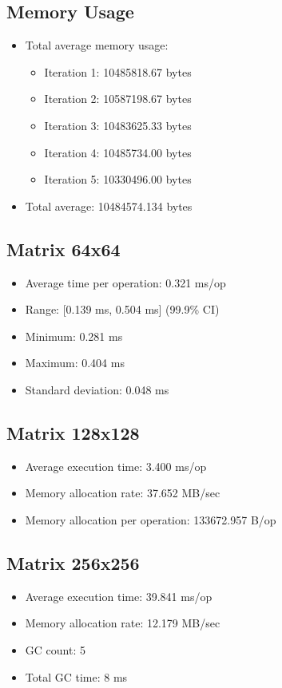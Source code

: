 \documentclass{article}
\begin{document}
\subsection{Memory Usage}
\begin{itemize}
    \item Total average memory usage:
        \begin{itemize}
            \item Iteration 1: 10485818.67 bytes
            \item Iteration 2: 10587198.67 bytes
            \item Iteration 3: 10483625.33 bytes
            \item Iteration 4: 10485734.00 bytes
            \item Iteration 5: 10330496.00 bytes
        \end{itemize}
    \item Total average: 10484574.134 bytes
\end{itemize}

\subsection{Matrix 64x64}
\begin{itemize}
    \item Average time per operation: 0.321 ms/op
    \item Range: [0.139 ms, 0.504 ms] (99.9\% CI)
    \item Minimum: 0.281 ms
    \item Maximum: 0.404 ms
    \item Standard deviation: 0.048 ms
\end{itemize}

\subsection{Matrix 128x128}
\begin{itemize}
    \item Average execution time: 3.400 ms/op
    \item Memory allocation rate: 37.652 MB/sec
    \item Memory allocation per operation: 133672.957 B/op
\end{itemize}

\subsection{Matrix 256x256}
\begin{itemize}
    \item Average execution time: 39.841 ms/op
    \item Memory allocation rate: 12.179 MB/sec
    \item GC count: 5
    \item Total GC time: 8 ms
\end{itemize}
\end{document}
